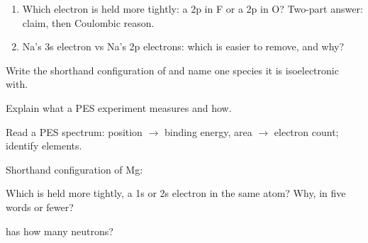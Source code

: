 \documentclass{apchem-notes}
\begin{document}

\begin{enumerate}[leftmargin=*,itemsep=0.4em]
  \item Which electron is held more tightly: a 2p in F or a 2p in O? Two-part
        answer: claim, then Coulombic reason.
  \item Na's 3s electron vs Na's 2p electrons: which is easier to remove, and
        why?
\end{enumerate}

\begin{exitticket}
Write the shorthand configuration of  and name one species it is
isoelectronic with.
\end{exitticket}


\begin{objectives}
  \item Explain what a PES experiment measures and how.
  \item Read a PES spectrum: position $\to$ binding energy, area $\to$
        electron count; identify elements.
\end{objectives}


\begin{warmup}[3]
  \item Shorthand configuration of Mg: 
  \item Which is held more tightly, a 1s or 2s electron in the same atom?
        Why, in five words or fewer? 
  \item {} has how many neutrons? 
\end{warmup}


\end{document}
